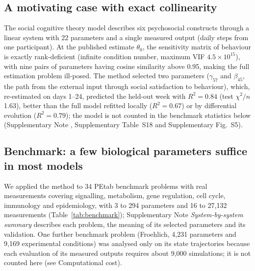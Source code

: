 \documentclass[pdflatex,sn-nature]{sn-jnl}
\theoremstyle{plain}
\begin{document}
\subsection*{A motivating case with exact collinearity}\label{sec:sct}

The social cognitive theory model\cite{bib3,bib34,bib35} describes six psychosocial constructs through a linear system with 22 parameters and a single measured output (daily steps from one participant\cite{bib35}). At the published estimate $\theta_0$, the sensitivity matrix of behaviour is exactly rank-deficient (infinite condition number, maximum VIF $4.5\times10^{15}$), with nine pairs of parameters having cosine similarity above 0.95, making the full estimation problem ill-posed. The method selected two parameters ($\gamma_{57}$ and $\beta_{45}$, the path from the external input through social satisfaction to behaviour), which, re-estimated on days 1--24, predicted the held-out week with $R^2=0.84$ (test $\chi^2/n$ 1.63), better than the full model refitted locally ($R^2=0.67$) or by differential evolution ($R^2=0.79$); the model is not counted in the benchmark statistics below (Supplementary Note \textit{}, Supplementary Table~S18 and Supplementary Fig.~S5).

\subsection*{Benchmark: a few biological parameters suffice in most models}\label{sec:benchmark}

We applied the method to 34 PEtab benchmark problems with real measurements\cite{bib31,bib27} covering signalling, metabolism, gene regulation, cell cycle, immunology and epidemiology, with 3 to 294 parameters and 16 to 27,132 measurements (Table~\ref{tab:benchmark}); Supplementary Note \textit{System-by-system summary} describes each problem, the meaning of its selected parameters and its validation. One further benchmark problem (Froehlich, 4,231 parameters and 9,169 experimental conditions) was analysed only on its state trajectories because each evaluation of its measured outputs requires about 9,000 simulations; it is not counted here (see Computational cost).
\end{document}
